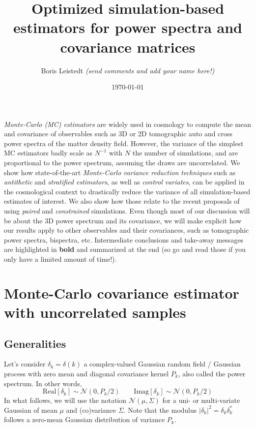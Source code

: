 \documentclass{aastex6}
\newcommand{\equ}[1]{\begin{equation}#1\end{equation}}
\begin{document}
 
\title{Optimized simulation-based estimators for power spectra and covariance matrices} 
\author{Boris Leistedt \textit{(send comments and add your name here!)}}
\date{\today}
\maketitle

\vspace*{-3mm}




\textit{Monte-Carlo (MC) estimators} are widely used in cosmology to compute the mean and covariance of observables such as 3D or 2D tomographic auto and cross power spectra of the matter density field.
However, the variance of the simplest MC estimators badly scale as $N^{-1}$ with $N$ the number of simulations, and are proportional to the power spectrum, assuming the draws are uncorrelated.
We show how state-of-the-art \textit{Monte-Carlo variance reduction techniques} such as \textit{antithetic} and \textit{stratified estimators}, as well as \textit{control variates}, can be applied in the cosmological context to drastically reduce the variance of all simulation-based estimates of interest.
We also show how those relate to the recent proposals of using  \textit{paired} and \textit{constrained} simulations.
Even though most of our discussion will be about the 3D power spectrum and its covariance, we will make explicit how our results apply to other observables and their covariances, such as tomographic power spectra, bispectra, etc.
Intermediate conclusions and take-away messages are highlighted in \textbf{bold} and summarized at the end (so go and read those if you only have a limited amount of time!).

\section{Monte-Carlo covariance estimator with uncorrelated samples}

\subsection{Generalities}

Let's consider $\delta_k = \delta(k)$ a complex-valued Gaussian random field / Gaussian process with zero mean and diagonal covariance kernel $P_{k}$, also called the power spectrum. In other words,
\equ{
	\mathrm{Real}[\delta_k] \sim \mathcal{N}(0, P_k/2) \quad \quad \mathrm{Imag}[\delta_k] \sim \mathcal{N}(0, P_k/2) \label{eq:p_delta}
}
In what follows, we will use the notation $\mathcal{N}(\mu, \Sigma)$ for a uni- or multi-variate Gaussian of mean $\mu$ and (co)variance $\Sigma$.
Note that the modulus $|\delta_k|^2 = \delta_k \delta_k^*$ follows a zero-mean Gaussian distribution of variance $P_k$.
\end{document}

